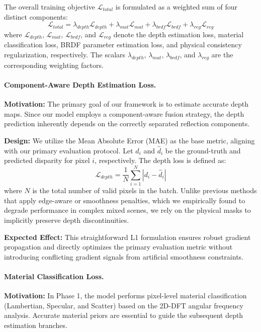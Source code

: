 The overall training objective $\mathcal{L}_{total}$ is formulated as a weighted sum of four distinct components:
\begin{equation}
\label{eq:eq43}
\mathcal{L}_{total} = \lambda_{depth} \mathcal{L}_{depth} + \lambda_{mat} \mathcal{L}_{mat} + \lambda_{brdf} \mathcal{L}_{brdf} + \lambda_{reg} \mathcal{L}_{reg}
\end{equation}
where $\mathcal{L}_{depth}$, $\mathcal{L}_{mat}$, $\mathcal{L}_{brdf}$, and $\mathcal{L}_{reg}$ denote the depth estimation loss, material classification loss, BRDF parameter estimation loss, and physical consistency regularization, respectively. The scalars $\lambda_{depth}$, $\lambda_{mat}$, $\lambda_{brdf}$, and $\lambda_{reg}$ are the corresponding weighting factors.

\paragraph{Component-Aware Depth Estimation Loss.}
\textbf{Motivation:} The primary goal of our framework is to estimate accurate depth maps. Since our model employs a component-aware fusion strategy, the depth prediction inherently depends on the correctly separated reflection components. 

\textbf{Design:} We utilize the Mean Absolute Error (MAE) as the base metric, aligning with our primary evaluation protocol. Let $d_i$ and $\hat{d}_i$ be the ground-truth and predicted disparity for pixel $i$, respectively. The depth loss is defined as:
\begin{equation}
\label{eq:eq44}
\mathcal{L}_{depth} = \frac{1}{N} \sum_{i=1}^{N} | d_i - \hat{d}_i |
\end{equation}
where $N$ is the total number of valid pixels in the batch. Unlike previous methods that apply edge-aware or smoothness penalties, which we empirically found to degrade performance in complex mixed scenes, we rely on the physical masks to implicitly preserve depth discontinuities.

\textbf{Expected Effect:} This straightforward L1 formulation ensures robust gradient propagation and directly optimizes the primary evaluation metric without introducing conflicting gradient signals from artificial smoothness constraints.

\paragraph{Material Classification Loss.}
\textbf{Motivation:} In Phase 1, the model performs pixel-level material classification (Lambertian, Specular, and Scatter) based on the 2D-DFT angular frequency analysis. Accurate material priors are essential to guide the subsequent depth estimation branches.

